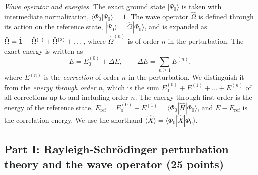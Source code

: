 \documentclass[prc]{revtex4}
\begin{document}
\emph{Wave operator and energies.} The exact ground state
$|\Psi_0\rangle$ is taken with intermediate normalization,
$\langle\Phi_0|\Psi_0\rangle=1$. The wave operator $\hat{\Omega}$ is
defined through its action on the reference state,
$|\Psi_0\rangle=\hat{\Omega}|\Phi_0\rangle$, and is expanded as
$\hat{\Omega}=\hat{\bf 1}+\hat{\Omega}^{(1)}+\hat{\Omega}^{(2)}+\dots$,
where $\hat{\Omega}^{(n)}$ is of order $n$ in the perturbation. The
exact energy is written as
\[
E=E^{(0)}_0+\Delta E,\qquad \Delta E=\sum_{n\geq 1}E^{(n)},
\]
where $E^{(n)}$ is the \emph{correction} of order $n$ in the
perturbation. We distinguish it from the \emph{energy through order
$n$}, which is the sum
$E^{(0)}_0+E^{(1)}+\dots+E^{(n)}$ of all corrections up to and
including order $n$. The energy through first order is the energy of
the reference state,
$E_{\mathrm{ref}}=E^{(0)}_0+E^{(1)}=\langle\Phi_0|\hat{H}|\Phi_0\rangle$,
and $E-E_{\mathrm{ref}}$ is the correlation energy. We use the
shorthand $\langle\hat{X}\rangle=\langle\Phi_0|\hat{X}|\Phi_0\rangle$.

\subsection*{Part I: Rayleigh-Schr\"odinger perturbation theory and the wave operator (25 points)}
\end{document}
